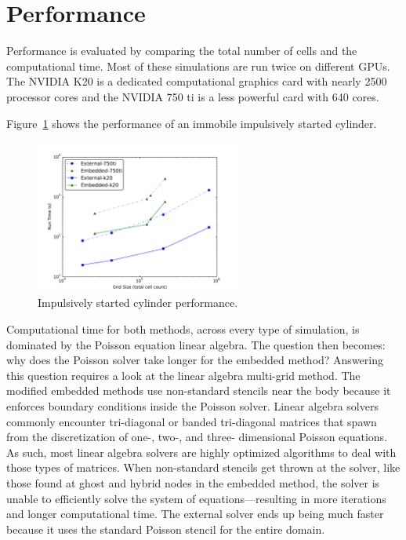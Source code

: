 \section{Performance}
Performance is evaluated by comparing the total number of cells and the computational time. 
Most of these simulations are run twice on different GPUs. 
The NVIDIA K20 is a dedicated computational graphics card with nearly 2500 processor cores and the NVIDIA 750 ti is a less powerful card with 640 cores.

Figure~\ref{fig:cyperf} shows the performance of an immobile impulsively started cylinder. 
\begin{figure}[!htb]
	\centering
	\par\medskip
	\includegraphics[width=0.6\textwidth]{cylinder_performance}
	\caption{Impulsively started cylinder performance.}
	\label{fig:cyperf}
\end{figure}
Computational time for both methods, across every type of simulation, is dominated by the Poisson equation linear algebra. 
The question then becomes: why does the Poisson solver take longer for the embedded method? 
Answering this question requires a look at the linear algebra multi-grid method.  
The modified embedded methods use non-standard stencils near the body because it enforces boundary conditions inside the Poisson solver.  
Linear algebra solvers commonly encounter tri-diagonal or banded tri-diagonal
matrices that spawn from the discretization of one-, two-, and three- dimensional Poisson equations. 
As such, most linear algebra solvers are highly optimized algorithms to deal with those types of matrices. 
When non-standard stencils get thrown at the solver, like those found at ghost and hybrid nodes in the embedded method, the solver is unable to efficiently solve the system of equations---resulting in more iterations and longer computational time. 
The external solver ends up being much faster because it uses the standard Poisson stencil for the entire domain. 

